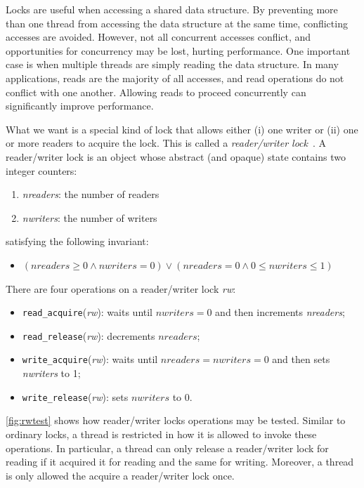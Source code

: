 \documentclass{report}
\begin{document}
Locks are useful when accessing a shared data structure.  By preventing
more than one thread from accessing the data structure at the same
time, conflicting accesses are avoided.  However, not all concurrent
accesses conflict, and opportunities for concurrency may be lost,
hurting performance.  One important case is when multiple threads
are simply reading the data structure.
In many applications, reads are the majority of all accesses,
and read operations do not conflict with one another.
Allowing reads to proceed concurrently can significantly improve performance.

What we want is a special kind of lock that allows either (i) one writer
or (ii) one or more readers to acquire the lock.  This is called
a \emph{reader/writer lock}~\cite{CHP71}.
%
A reader/writer lock is an object whose abstract (and opaque)
state contains two integer counters:
\begin{enumerate}
\item \textit{nreaders}: the number of readers
\item \textit{nwriters}: the number of writers
\end{enumerate}
satisfying the following invariant:
\begin{itemize}
\item [] $(\mathit{nreaders} \ge 0 \land \mathit{nwriters} = 0) \lor
    (\mathit{nreaders} = 0 \land 0 \le \mathit{nwriters} \le 1)$
\end{itemize}

There are four operations on a reader/writer lock \textit{rw}:
\begin{itemize}
\item \texttt{read\_acquire}(\textit{rw}): waits until $\mathit{nwriters} = 0$
and then increments \textit{nreaders};
\item \texttt{read\_release}(\textit{rw}): decrements $\mathit{nreaders}$;
\item \texttt{write\_acquire}(\textit{rw}): waits until
$\mathit{nreaders} = \mathit{nwriters} = 0$
and then sets \textit{nwriters} to 1;
\item \texttt{write\_release}(\textit{rw}): sets $\mathit{nwriters}$ to 0.
\end{itemize}

\autoref{fig:rwtest} shows how reader/writer locks operations
may be tested.
Similar to ordinary locks, a thread is restricted in how it is allowed to
invoke these operations.
In particular, a thread can only release a reader/writer lock for reading
if it acquired it for reading and the same for writing.
Moreover, a thread is only allowed the acquire a reader/writer lock once.
\end{document}
